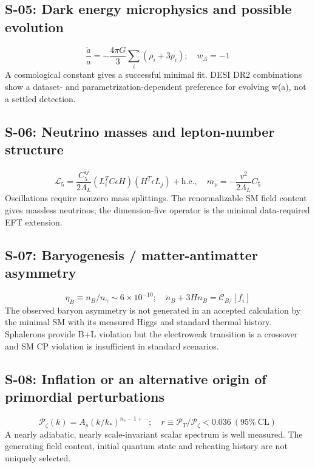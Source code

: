 \subsection*{S-05: Dark energy microphysics and possible evolution}
\begingroup\small
\begin{equation*}
\frac{\ddot a}{a}=-\frac{4\pi G}{3}\sum_i(\rho_i+3p_i);\allowbreak\quad w_\Lambda=-1
\end{equation*}
\endgroup
A cosmological constant gives a successful minimal fit. DESI DR2 combinations show a dataset- and parametrization-dependent preference for evolving w(a), not a settled detection.
\subsection*{S-06: Neutrino masses and lepton-number structure}
\begingroup\small
\begin{equation*}
\mathcal L_5=\frac{C_5^{ij}}{2\Lambda_L}(L_i^T C\epsilon H)(H^T\epsilon L_j)+\mathrm{h.c.},\quad m_\nu=-\frac{v^2}{2\Lambda_L}C_5
\end{equation*}
\endgroup
Oscillations require nonzero mass splittings. The renormalizable SM field content gives massless neutrinos; the dimension-five operator is the minimal data-required EFT extension.
\subsection*{S-07: Baryogenesis / matter-antimatter asymmetry}
\begingroup\small
\begin{equation*}
\eta_B\equiv n_B/n_\gamma\sim6\times10^{-10};\allowbreak\quad \dot n_B+3Hn_B=\mathcal C_{B\!\!\!/}[f_i]
\end{equation*}
\endgroup
The observed baryon asymmetry is not generated in an accepted calculation by the minimal SM with its measured Higgs and standard thermal history. Sphalerons provide B+L violation but the electroweak transition is a crossover and SM CP violation is insufficient in standard scenarios.
\subsection*{S-08: Inflation or an alternative origin of primordial perturbations}
\begingroup\small
\begin{equation*}
\mathcal P_\zeta(k)=A_s(k/k_*)^{n_s-1+\cdots};\allowbreak\quad r\equiv\mathcal P_T/\mathcal P_\zeta<0.036\ (95\%\ \mathrm{CL})
\end{equation*}
\endgroup
A nearly adiabatic, nearly scale-invariant scalar spectrum is well measured. The generating field content, initial quantum state and reheating history are not uniquely selected.
